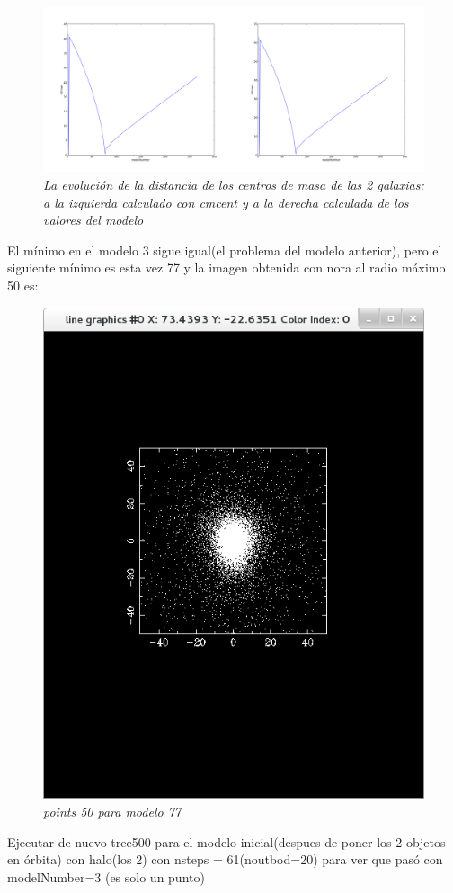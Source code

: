 \documentclass[12pt]{book}
\begin{document}
\begin{itemize}
\begin{figure}[h!]
 \centering
 \includegraphics[scale=0.2]{imgDistcon2Comb.png}
 \caption{\emph{La evolución de la distancia de los centros de masa de las 2 galaxias: a la izquierda calculado con cmcent y a la derecha calculada de los valores del modelo}}
 \label{Fig: 5}
\end{figure}
\end{itemize}

El mínimo en el modelo 3 sigue igual(el problema del modelo anterior), pero el siguiente mínimo es esta vez 77 y la imagen obtenida con nora al radio máximo 50 es:

\begin{figure}[h!]
 \centering
 \includegraphics[scale=0.5]{imgConModel77Points50.png}
 \caption{\emph{points 50 para modelo 77}}
 \label{Fig: 5}
\end{figure}

Ejecutar de nuevo tree500 para el modelo inicial(despues de poner los 2 objetos en órbita) con halo(los 2) con nsteps = 61(noutbod=20) para ver que pasó con modelNumber=3 (es solo un punto)
\end{document}
